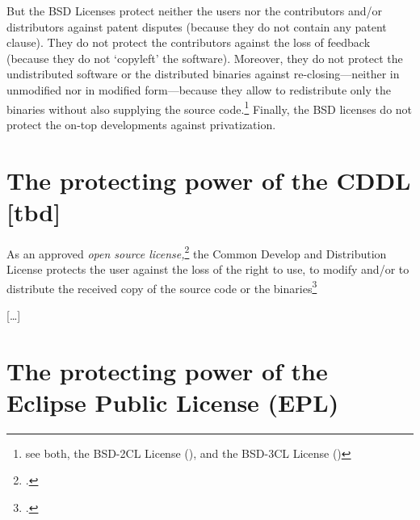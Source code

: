 But the BSD Licenses protect neither the users nor the contributors
and/or distributors against patent disputes (because they do not contain any
patent clause). They do not protect the contributors against the loss of
feedback (because they do not `copyleft' the software). Moreover, they do not
protect the undistributed software or the distributed binaries against
re-closing---neither in unmodified nor in modified form---because they
allow to redistribute only the binaries without also supplying the source
code.\footnote{see both, the BSD-2CL License (\cite[cf.][\nopage
wp]{BsdLicense2Clause}), and the BSD-3CL License (\cite[cf.][\nopage
wp]{BsdLicense3Clause})} Finally, the BSD licenses do not protect the on-top
developments against privatization.

\section{\texorpdfstring{The protecting power of the}{The} CDDL [tbd]}

As an approved \emph{open source license,}\footcite[cf.][\nopage wp]{OSI2012b}
the Common Develop and Distribution License protects the user
against the loss of the right to use, to modify and/or to distribute the
received copy of the source code or the binaries\footcite[cf.][\nopage wp. 
§?]{Cddl10OsiLicense2004a}

[\ldots]

\section{\texorpdfstring{The protecting power of the}{The} Eclipse Public License (EPL)}

